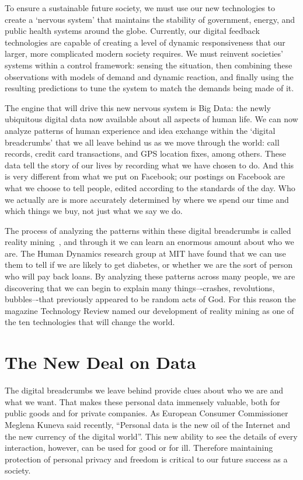 To ensure a sustainable future society, we must use our new technologies to create a `nervous system’ that maintains the stability of government, energy, and public health systems around the globe.
Currently, our digital feedback technologies are capable of creating a level of dynamic responsiveness that our larger, more complicated modern society requires.
We must reinvent societies’ systems within a control framework: sensing the situation, then combining these observations with models of demand and dynamic reaction, and finally using the resulting predictions to tune the system to match the demands being made of it.

The engine that will drive this new nervous system is Big Data: the newly ubiquitous digital data now available about all aspects of human life.
We can now analyze patterns of human experience and idea exchange within the `digital breadcrumbs’ that we all leave behind us as we move through the world: call records, credit card transactions, and GPS location fixes, among others.
These data tell the story of our lives by recording what we have chosen to do.
And this is very different from what we put on Facebook; our postings on Facebook are what we choose to tell people, edited according to the standards of the day.
Who we actually are is more accurately determined by where we spend our time and which things we buy, not just what we say we do.

The process of analyzing the patterns within these digital breadcrumbs is called reality mining~\cite{eagle2006reality,pentland2009reality}, and through it we can learn an enormous amount about who we are.
The Human Dynamics research group at MIT have found that we can use them to tell if we are likely to get diabetes, or whether we are the sort of person who will pay back loans.
By analyzing these patterns across many people, we are discovering that we can begin to explain many things–-crashes, revolutions, bubbles–-that previously appeared to be random acts of God.
For this reason the magazine Technology Review named our development of reality mining as one of the ten technologies that will change the world\cite{greene2008reality}. 

\section{The New Deal on Data}

The digital breadcrumbs we leave behind provide clues about who we are and what we want.
That makes these personal data immensely valuable, both for public goods and for private companies.
As European Consumer Commissioner Meglena Kuneva said recently, ``Personal data is the new oil of the Internet and the new currency of the digital world''.
This new ability to see the details of every interaction, however, can be used for good or for ill.
Therefore maintaining protection of personal privacy and freedom is critical to our future success as a society.

